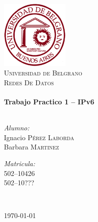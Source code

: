 \begin{titlepage}

\begin{center}

\includegraphics[width=0.25\textwidth]{./logo_UB.png}\\[1cm] 

\textsc{\LARGE Universidad de Belgrano}\\[1.5cm]

\textsc{\Large Redes De Datos}\\[0.5cm]

\HRule \\[0.4cm]
{ \huge \bfseries Trabajo Practico 1 -- IPv6}\\[0.4cm]
\HRule \\[1.5cm]

\begin{minipage}{0.4\textwidth}
\begin{flushleft} \large
\emph{Alumno:}\\
Ignacio \textsc{P\'erez Laborda}\\
Barbara \textsc{Martinez}\\
\end{flushleft}
\end{minipage}
\begin{minipage}{0.4\textwidth}
\begin{flushright} \large
\emph{Matricula:} \\
502--10426\\
502--10???\\
\end{flushright}
\end{minipage}\\[1.5cm]

\vfill

{\large \today}

\end{center}

\end{titlepage}
